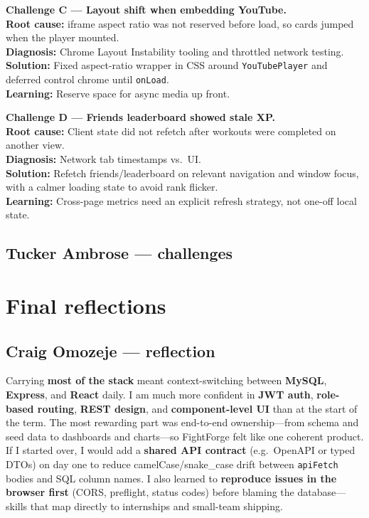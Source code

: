 \documentclass[11pt,letterpaper]{article}
\begin{document}
\vspace{0.6em}
\textbf{Challenge C --- Layout shift when embedding YouTube.}\\
\textbf{Root cause:} iframe aspect ratio was not reserved before load, so cards jumped when the player mounted.\\
\textbf{Diagnosis:} Chrome Layout Instability tooling and throttled network testing.\\
\textbf{Solution:} Fixed aspect-ratio wrapper in CSS around \texttt{YouTubePlayer} and deferred control chrome until \texttt{onLoad}.\\
\textbf{Learning:} Reserve space for async media up front.

\vspace{0.6em}
\textbf{Challenge D --- Friends leaderboard showed stale XP.}\\
\textbf{Root cause:} Client state did not refetch after workouts were completed on another view.\\
\textbf{Diagnosis:} Network tab timestamps vs.\ UI.\\
\textbf{Solution:} Refetch friends/leaderboard on relevant navigation and window focus, with a calmer loading state to avoid rank flicker.\\
\textbf{Learning:} Cross-page metrics need an explicit refresh strategy, not one-off local state.

\subsection{Tucker Ambrose --- challenges}

\section{Final reflections}

\subsection{Craig Omozeje --- reflection}
Carrying \textbf{most of the stack} meant context-switching between \textbf{MySQL}, \textbf{Express}, and \textbf{React} daily. I am much more confident in \textbf{JWT auth}, \textbf{role-based routing}, \textbf{REST design}, and \textbf{component-level UI} than at the start of the term. The most rewarding part was end-to-end ownership---from schema and seed data to dashboards and charts---so FightForge felt like one coherent product. If I started over, I would add a \textbf{shared API contract} (e.g.\ OpenAPI or typed DTOs) on day one to reduce camelCase/snake\_case drift between \texttt{apiFetch} bodies and SQL column names. I also learned to \textbf{reproduce issues in the browser first} (CORS, preflight, status codes) before blaming the database---skills that map directly to internships and small-team shipping.
\end{document}
